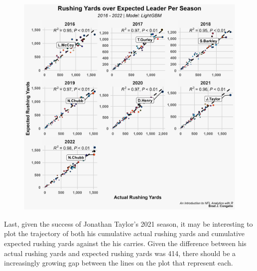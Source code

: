 \documentclass[
  letterpaper,
]{krantz}
\begin{document}
\begin{figure}

{\centering \includegraphics[width=6in,height=\textheight]{images/ryoe_per_season.png}

}

\end{figure}

Last, given the success of Jonathan Taylor's 2021 season, it may be
interesting to plot the trajectory of both his cumulative actual rushing
yards and cumulative expected rushing yards against the his carries.
Given the difference between his actual rushing yards and expected
rushing yards was 414, there should be a increasingly growing gap
between the lines on the plot that represent each.
\end{document}
